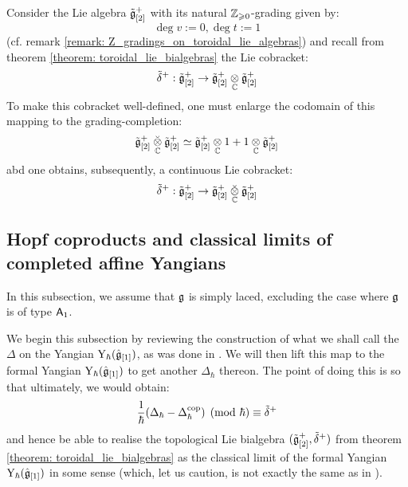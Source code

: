         \begin{corollary} \label{coro: toroidal_topological_lie_bialgebras}
            Consider the Lie algebra $\tilde{\mathfrak{g}}_{[2]}^+$ with its natural $\mathbb{Z}_{\geqslant 0}$-grading given by:
                $$\deg v := 0, \deg t := 1$$
            (cf. remark \ref{remark: Z_gradings_on_toroidal_lie_algebras}) and recall from theorem \ref{theorem: toroidal_lie_bialgebras} the Lie cobracket:
                $$\tilde{\delta}^+: \tilde{\g}_{[2]}^+ \to \tilde{\g}_{[2]}^+ \tensor_{\bbC} \tilde{\g}_{[2]}^+$$
            To make this cobracket well-defined, one must enlarge the codomain of this mapping to the grading-completion:
                $$\tilde{\g}_{[2]}^+ \brevetensor_{\bbC} \tilde{\g}_{[2]}^+ \cong \tilde{\g}_{[2]}^+ \tensor_{\bbC} 1 + 1 \tensor_{\bbC} \tilde{\g}_{[2]}^+$$
            abd one obtains, subsequently, a continuous Lie cobracket:
                $$\tilde{\delta}^+: \tilde{\g}_{[2]}^+ \to \tilde{\g}_{[2]}^+ \brevetensor_{\bbC} \tilde{\g}_{[2]}^+$$
        \end{corollary}
    
    \subsection{Hopf coproducts and classical limits of completed affine Yangians}
        \begin{convention}
            In this subsection, we assume that $\mathfrak{g}$ is simply laced, excluding the case where $\mathfrak{g}$ is of type $\mathsf{A}_1$. 
        \end{convention}

        We begin this subsection by reviewing the construction of what we shall call the  $\Delta$ on the Yangian $\mathrm{Y}_{\hbar}(\hat{\mathfrak{g}}_{[1]})$, as was done in \cite[Sections 4 and 5]{guay_nakajima_wendlandt_affine_yangian_coproduct}. We will then lift this map to the formal Yangian $\mathrm{Y}_{\hbar}(\hat{\mathfrak{g}}_{[1]})$ to get another  $\Delta_{\hbar}$ thereon. The point of doing this is so that ultimately, we would obtain:
            $$\frac{1}{\hbar}(\Delta_{\hbar} - \Delta_{\hbar}^{\mathrm{cop}}) \pmod{\hbar} \equiv \tilde{\delta}^+$$
        and hence be able to realise the topological Lie bialgebra $(\tilde{\mathfrak{g}}_{[2]}^+, \tilde{\delta}^+)$ from theorem \ref{theorem: toroidal_lie_bialgebras} as the classical limit of the formal Yangian $\mathrm{Y}_{\hbar}(\hat{\mathfrak{g}}_{[1]})$ in some sense (which, let us caution, is not exactly the same as in \cite{etingof_kazhdan_quantisation_1}).
        
